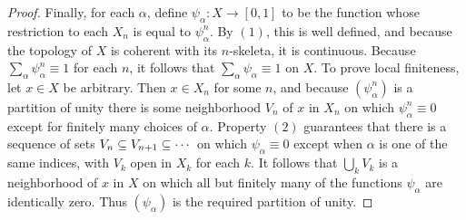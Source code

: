 \begin{proof}
Finally, for each $\alpha$, define $\psi_\alpha:X\to[0,1]$ to be the function whose restriction to each $X_n$ is equal to $\psi_\alpha^n$. By $(1)$, this is well defined, and because the topology of $X$ is coherent with its $n$-skeleta, it is continuous. Because $\sum_\alpha\psi_\alpha^n\equiv1$ for each $n$, it follows that $\sum_\alpha\psi_\alpha\equiv 1$ on $X$. To prove local finiteness, let $x\in X$ be arbitrary. Then $x\in X_n$ for some $n$, and because $(\psi_\alpha^n)$ is a partition of unity there is some neighborhood $V_n$ of $x$ in $X_n$ on which $\psi_\alpha^n\equiv0$ except for finitely many choices of $\alpha$. Property $(2)$ guarantees that there is a sequence of sets $V_n\subseteq V_{n+1}\subseteq\cdots$ on which $\psi_\alpha\equiv0$ except when $\alpha$ is one of the same indices, with $V_k$ open in $X_k$ for each $k$. It
follows that $\bigcup_kV_k$ is a neighborhood of $x$ in $X$ on which all but finitely many of the functions $\psi_\alpha$ are identically zero. Thus $(\psi_\alpha)$ is the required partition of unity.
\end{proof}
